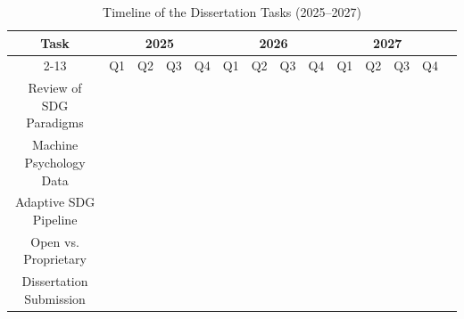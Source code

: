 \documentclass[12pt,a4paper]{article}
\begin{document}
\begin{table}[ht]
\centering
\renewcommand{\arraystretch}{1.5}
\renewcommand{\tabcolsep}{4pt}
\caption{Timeline of the Dissertation Tasks (2025–2027)}
\begin{tabular}{|c|c|c|c|c|c|c|c|c|c|c|c|c|c|}
\hline
\multirow{2}{*}{\textbf{Task}} & \multicolumn{4}{c|}{\textbf{2025}} & \multicolumn{4}{c|}{\textbf{2026}} & \multicolumn{4}{c|}{\textbf{2027}} \\
\cline{2-13}
 & Q1 & Q2 & Q3 & Q4 & Q1 & Q2 & Q3 & Q4 & Q1 & Q2 & Q3 & Q4 \\
\hline
Review of SDG Paradigms & \cellcolor{blue!40} & \cellcolor{blue!40}  &   &   &   &  &   &   &   &   &   &   \\
\hline
Machine Psychology Data &   &   & \cellcolor{blue!40} & \cellcolor{blue!40} & \cellcolor{blue!40}  &   &   &   &   &   &   &   \\
\hline
Adaptive SDG Pipeline &   &   &   &   & \cellcolor{blue!40} & \cellcolor{blue!40} & \cellcolor{blue!40} &   &   &   &   &   \\
\hline
Open vs. Proprietary &   &   &   &   &   &   &   & \cellcolor{blue!40} & \cellcolor{blue!40} & \cellcolor{blue!40} &   &   \\
\hline
Dissertation Submission &   &   &   &   &   &   &   &   &   &   & \cellcolor{blue!40} & \cellcolor{blue!40} \\
\hline
\end{tabular}
\end{table}


\end{document}
